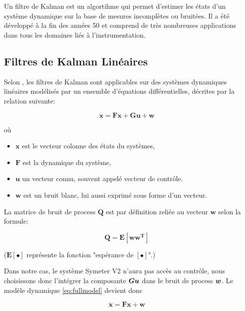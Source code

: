 \documentclass[12pt,a4paper]{report}
\begin{document}
	\para Un filtre de Kalman est un algortihme qui permet d'estimer les états d'un système dynamique sur la base  de mesures incomplètes ou bruitées. Il a été développé à la fin des années 50 et comprend de très nombreuses applications dans tous les domaines liés à l'instrumentation.
	
	\subsection{Filtres de Kalman Linéaires}
	Selon \cite{zarchan_fundamentals_2009}, les filtres de Kalman sont applicables sur des systèmes dynamiques linéaires modélisés par un ensemble d'équations différentielles, décrites par la relation suivante:
	
	\begin{equation}
		\label{eq:fullmodel}
	\boldsymbol{
		\dot{x} = Fx + Gu + w
	}
	\end{equation}
	
	\para où

	\begin{itemize}
	\item $\boldsymbol{x}$ est le vecteur colonne des états du systèmes, 
	\item $\boldsymbol{F}$ est la dynamique du système, 
	\item $\boldsymbol{u}$  un vecteur connu, souvent appelé vecteur de contrôle.
	\item $\boldsymbol{w}$ est un bruit blanc, lui aussi exprimé sous forme d'un vecteur.
	\end{itemize}

	La matrice de bruit de process \(\boldsymbol{Q}\) est par définition reliée au vecteur \(\boldsymbol{w}\) selon la formule:

	\begin{equation}
		\boldsymbol{Q = E[ww^T]}
	\end{equation}

	($\boldsymbol{E[\bullet]}$ représente la fonction "espérance de \([\bullet]\)".)
	
	\para Dans notre cas, le système Symeter V2 n'aura pas accès au contrôle, nous choisissons donc l'intégrer la composante $\boldsymbol{Gu}$ dans le bruit de process $\boldsymbol{w}$. Le modèle dynamique \ref{eq:fullmodel} devient donc 
	
	\begin{equation}
		\label{eq:actualmodel}
			\boldsymbol{
			\dot{x} = Fx + w
		}
	\end{equation}
\end{document}
